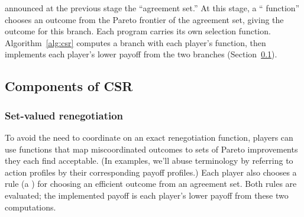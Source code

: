 \documentclass[sigconf]{aamas}
\theoremstyle{definition}
\begin{document}
\begin{enumerate}
    announced at the previous stage the “agreement set.''
    At this stage, a ``\selfunction{} function''
    chooses an outcome from the Pareto frontier
    of the agreement set,
    giving the outcome for this branch. Each program carries its own
    selection function. Algorithm~\ref{alg:csr} computes a branch with
    each player's function, then implements each player's lower payoff
    from the two branches (Section~\ref{sec:sub:components}).
\end{enumerate}


\subsection{Components of
CSR}
\label{sec:sub:components}

\subsubsection{Set-valued renegotiation}

To avoid the need
to coordinate on an exact renegotiation function,
players
can
use functions
that map miscoordinated outcomes
to sets of Pareto improvements
they each find acceptable.
(In examples, we'll abuse terminology by referring to action profiles
by their corresponding payoff profiles.)
Each player also chooses a rule
(a )
for choosing an efficient outcome from an agreement set.
Both rules are evaluated; the implemented payoff is each player's
lower payoff from these two computations.
\end{document}
